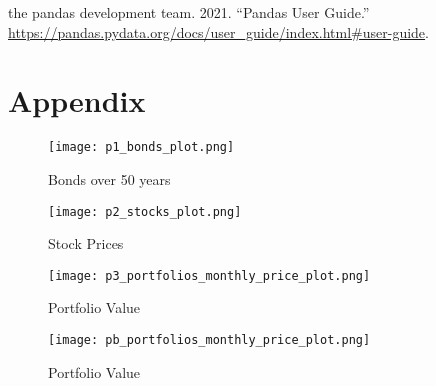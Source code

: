 \documentclass[
  11pt,
]{article}
\begin{document}
\leavevmode\hypertarget{ref-pandas}{}%
the pandas development team. 2021. ``Pandas User Guide.'' \url{https://pandas.pydata.org/docs/user_guide/index.html\#user-guide}.

\newpage

\hypertarget{appendix}{%
\section*{Appendix}\label{appendix}}

\begin{figure}
\centering
\texttt{[image: p1\_bonds\_plot.png]}
\caption{Bonds over 50 years}
\end{figure}

\begin{figure}
\centering
\texttt{[image: p2\_stocks\_plot.png]}
\caption{Stock Prices}
\end{figure}

\begin{figure}
\centering
\texttt{[image: p3\_portfolios\_monthly\_price\_plot.png]}
\caption{Portfolio Value}
\end{figure}

\begin{figure}
\centering
\texttt{[image: pb\_portfolios\_monthly\_price\_plot.png]}
\caption{Portfolio Value}
\end{figure}
\end{document}
